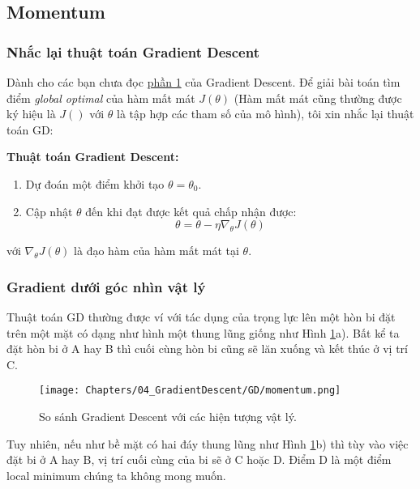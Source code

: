  
\subsection{Momentum}
 
\subsubsection{Nhắc lại thuật toán Gradient Descent}
Dành cho các bạn chưa đọc \href{http://machinelearningcoban.com/2017/01/12/gradientdescent/}{phần 1} của Gradient Descent. Để giải bài toán tìm điểm \textit{global optimal} của hàm mất mát $J(\theta)$ (Hàm mất mát cũng thường được ký hiệu là $J()$ với $\theta$ là tập hợp các tham số của mô hình), tôi xin nhắc lại thuật toán GD: 
 
\textbf{Thuật toán Gradient Descent:} 
\begin{enumerate}
    \item  Dự đoán một điểm khởi tạo $\theta = \theta_0$. 
    \item  Cập nhật $\theta$ đến khi đạt được kết quả chấp nhận được:  
\begin{equation} 
\theta = \theta - \eta \nabla_{\theta}J(\theta) 
\end{equation} 
\end{enumerate}
với $\nabla_{\theta}J(\theta)$ là đạo hàm của hàm mất mát tại $\theta$. 
 
 
\subsubsection{Gradient dưới góc nhìn vật lý }
 
Thuật toán GD thường được ví với tác dụng của trọng lực lên một hòn bi đặt trên một mặt có dạng như hình một thung lũng giống như Hình \ref{fig:8_1}a). Bất kể ta đặt hòn bi ở A hay B thì cuối cùng hòn bi cũng sẽ lăn xuống và kết thúc ở vị trí C. 
 
\begin{figure}[t]
\centering
    \texttt{[image: Chapters/04\_GradientDescent/GD/momentum.png]}
    \caption[]{So sánh Gradient Descent với các hiện tượng vật lý.}
    \label{fig:8_1}
\end{figure}
Tuy nhiên, nếu như bề mặt có hai đáy thung lũng như Hình \ref{fig:8_1}b) thì tùy vào việc đặt bi ở A hay B, vị trí cuối cùng của bi sẽ ở C hoặc D. Điểm D là một điểm local minimum chúng ta không mong muốn.  
 
